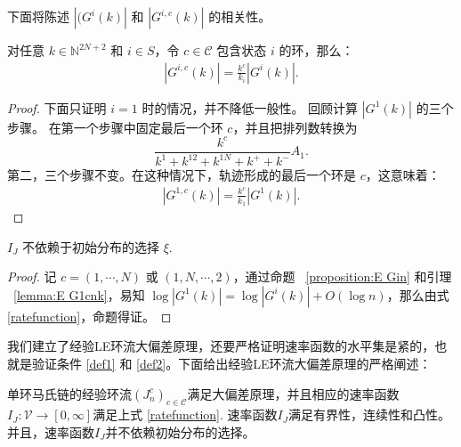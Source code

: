 下面将陈述 $| (G^i(k)|$ 和 $|G^{i,c}(k)|$ 的相关性。
\\
\begin{lemma}\label{lemma:E G1cnk}
	对任意 $k\in \mathbb{N}^{2N+2}$ 和 $i\in S$，令 $c\in \mathcal{C}$ 包含状态 $i$ 的环，那么：
	\begin{align*}
		\left|G^{i,c}(k)\right| = \frac{k^c}{k_i}\left|G^i(k)\right|.
	\end{align*}
\end{lemma}
\begin{proof}
	下面只证明 $i=1$ 时的情况，并不降低一般性。 回顾计算 $|G^1(k)|$ 的三个步骤。
	在第一个步骤中固定最后一个环 $c$，并且把排列数转换为
	\begin{equation*}
		\frac{k^c}{k^{1}+k^{12}+k^{1N}+k^{+}+k^{-}}A_1.
	\end{equation*}
	第二，三个步骤不变。在这种情况下，轨迹形成的最后一个环是 $c$，这意味着：
	\begin{align*}
		\left|G^{1,c}(k)\right| = \frac{k^c}{k_1}\left|G^1(k)\right|.
	\end{align*}
\end{proof}
\begin{proposition}\label{corollary:rate function is unrelated to the starting state}
	$I_J$ 不依赖于初始分布的选择 $\xi$.
\end{proposition}
\begin{proof}
	记 $c=(1,\cdots,N)$ 或 $(1,N,\cdots,2)$，通过命题 ~\ref{proposition:E Gin} 和引理 ~\ref{lemma:E G1cnk}，易知 $\log|G^1(k)|=\log|G^i(k)|+O(\log n)$，那么由式 \eqref{ratefunction}，命题得证。
\end{proof}


我们建立了经验LE环流大偏差原理，还要严格证明速率函数的水平集是紧的，也就是验证条件 \eqref{def1} 和 \eqref{def2}。下面给出经验LE环流大偏差原理的严格阐述：
\begin{theorem}\label{thm:LDP}
    单环马氏链的经验环流$(J^c_n)_{c\in\mathcal{C}}$满足大偏差原理，并且相应的速率函数$I_J:\mathcal{V}\to [0,\infty]$满足上式 \eqref{ratefunction}. 速率函数$I_J$满足有界性，连续性和凸性。并且，速率函数$I_J$并不依赖初始分布的选择。
\end{theorem}

